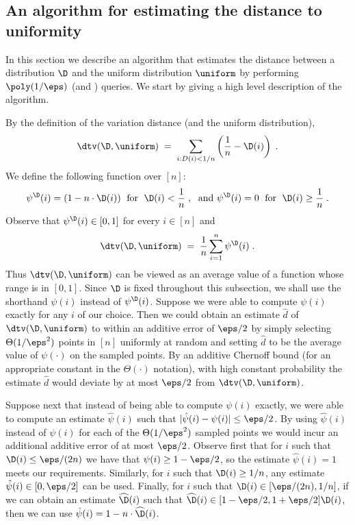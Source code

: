 \subsection{An algorithm for estimating the distance to uniformity}
In this section we describe an algorithm that estimates the distance
between a distribution $\D$ and the uniform distribution $\uniform$ by performing
$\poly(1/\eps)$ \PCOND (and \SAMP) queries. We start by giving a high
level description of the algorithm.

By the definition of the variation distance (and the uniform distribution),
\begin{equation}
\dtv(\D,\uniform) \;=\; \sum_{i:D(i) < 1/n}\left(\frac{1}{n} - \D(i)\right)\;.
\end{equation}
We define the following function over $[n]$:
\begin{equation}\label{eq:alpha-def}
\psi^\D(i) = (1-n\cdot\D(i)) \;\mbox{ for }\; \D(i) < \frac{1}{n}\;,\;
\mbox{ and } \psi^\D(i) = 0 \;\mbox{ for }\; \D(i) \geq \frac{1}{n}\;.
\end{equation}
Observe that $\psi^\D(i) \in [0,1]$ for every $i \in [n]$ and
\begin{equation}\label{eq:dtv-alpha-Dist}
\dtv(\D,\uniform) \;=\; \frac{1}{n}\sum_{i=1}^{n} \psi^\D(i)\;.
\end{equation}
Thus $\dtv(\D,\uniform)$ can be viewed as an average value of
a function whose range is in $[0,1]$. Since $\D$ is fixed throughout
this subsection, we shall use the shorthand $\psi(i)$ instead
of $\psi^\D(i)$.
Suppose we were able to compute $\psi(i)$ exactly for any $i$ of our
choice. Then we could obtain an estimate $\hat{d}$ of
$\dtv(\D,\uniform)$ to within an additive error of $\eps/2$ by simply
selecting $\Theta(1/\eps^2)$ points in $[n]$ uniformly at random
and setting $\hat{d}$ to be the average value of $\psi(\cdot)$ on
the sampled points. By an additive Chernoff bound (for an appropriate
constant in the $\Theta(\cdot)$ notation), with high constant
probability the estimate $\hat{d}$ would deviate by at most $\eps/2$
from $\dtv(\D,\uniform)$.

Suppose next that instead of being able to compute $\psi(i)$
exactly, we were able to compute an estimate $\hat{\psi}(i)$
such that
$|\hat{\psi}(i) -\psi(i)| \leq \eps/2$.
By using $\hat{\psi}(i)$ instead of $\psi(i)$ for
each of the $\Theta(1/\eps^2)$ sampled points we would incur
an additional additive error of at most $\eps/2$.
Observe first that for $i$ such that $\D(i) \leq \eps/(2n)$
we have that $\psi(i) \geq 1-\eps/2$, so the
estimate $\hat{\psi}(i)=1$ meets our requirements.
Similarly, for $i$ such that $\D(i) \geq 1/n$, any
estimate $\hat{\psi}(i)\in [0,\eps/2]$ can be used.
Finally, for $i$ such that $\D(i) \in [\eps/(2n),1/n]$,
if we can obtain an estimate $\widehat{\D}(i)$ such that
$\widehat{\D}(i) \in [1-\eps/2,1+\eps/2]\D(i)$, then we can use
$\hat{\psi}(i) = 1 - n\cdot \widehat{\D}(i)$.

